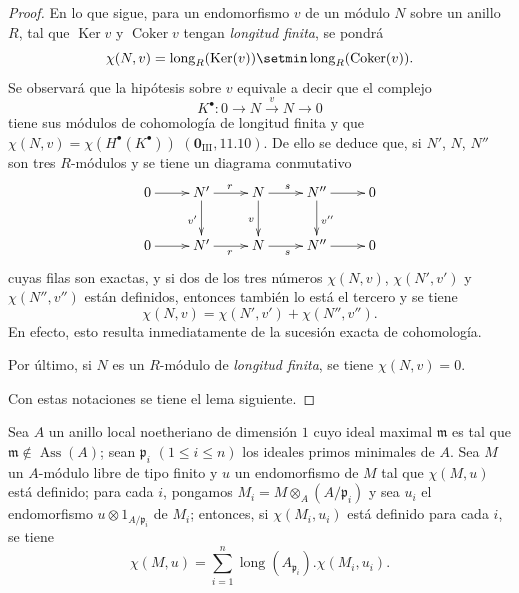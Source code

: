 \begin{proof}
En lo que sigue, para un endomorfismo $v$ de un módulo $N$ sobre un anillo $R$, tal que $\operatorname{Ker}v$ y $\operatorname{Coker}v$ tengan \emph{longitud finita}, se pondrá
\[
  \chi(N,v)=\operatorname{long}_R(\operatorname{Ker}(v))\setmin\operatorname{long}_R(\operatorname{Coker}(v)).
\]
Se observará que la hipótesis sobre $v$ equivale a decir que el complejo
\[
  K^\bullet:0\to N\xrightarrow{v}N\to0
\]
tiene sus módulos de cohomología de longitud finita y que $\chi(N,v)=\chi(H^\bullet(K^\bullet))$ $(\mathbf{0}_{\mathrm{III}},11.10)$.
De ello se deduce que, si $N'$, $N$, $N''$ son tres $R$-módulos y se tiene un diagrama conmutativo
\[
  \xymatrix{
    0 \ar[r] & N' \ar[r]^r \ar[d]_{v'} & N \ar[r]^s \ar[d]_v & N'' \ar[r] \ar[d]^{v''} & 0\\
    0 \ar[r] & N' \ar[r]_r & N \ar[r]_s & N'' \ar[r] & 0
  }
\]
cuyas filas son exactas, y si dos de los tres números $\chi(N,v)$, $\chi(N',v')$ y $\chi(N'',v'')$ están definidos, entonces también lo está el tercero y se tiene
\[
\label{IV.21.10.17.6}
  \chi(N,v)=\chi(N',v')+\chi(N'',v'').
  \tag{21.10.17.6}
\]
En efecto, esto resulta inmediatamente de la sucesión exacta de cohomología.

Por último, si $N$ es un $R$-módulo de \emph{longitud finita}, se tiene $\chi(N,v)=0$.

Con estas notaciones se tiene el lema siguiente.
\end{proof}

\begin{lemma}[21.10.17.7]
\label{IV.21.10.17.7}
Sea $A$ un anillo local noetheriano de dimensión $1$ cuyo ideal maximal $\mathfrak{m}$ es tal que $\mathfrak{m}\notin\operatorname{Ass}(A)$;
sean $\mathfrak{p}_i$ $(1\leq i\leq n)$ los ideales primos minimales de $A$.
Sea $M$ un $A$-módulo libre de tipo finito y $u$ un endomorfismo de $M$ tal que $\chi(M,u)$ está definido;
para cada $i$, pongamos $M_i=M\otimes_A(A/\mathfrak{p}_i)$ y sea $u_i$ el endomorfismo $u\otimes1_{A/\mathfrak{p}_i}$ de $M_i$;
entonces, si $\chi(M_i,u_i)$ está definido para cada $i$, se tiene
\[
\label{IV.21.10.17.8}
  \chi(M,u)=\sum_{i=1}^n\operatorname{long}(A_{\mathfrak{p}_i}).\chi(M_i,u_i).
  \tag{21.10.17.8}
\]
\end{lemma}

